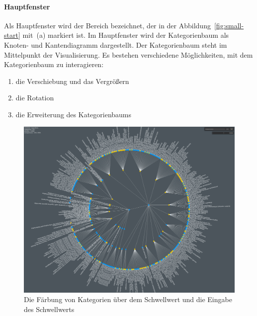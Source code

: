 \paragraph{Hauptfenster}
Als Hauptfenster wird der Bereich bezeichnet, der in der Abbildung~\ref{fig:small-start} mit~(a) markiert ist.
Im Hauptfenster wird der Kategorienbaum als Knoten- und Kantendiagramm dargestellt.
Der Kategorienbaum steht im Mittelpunkt der Visualisierung.
Es bestehen verschiedene Möglichkeiten, mit dem Kategorienbaum zu interagieren:
\begin{enumerate}[label*=(\arabic*),leftmargin=1.5cm,series=example]
\item{die Verschiebung und das Vergrößern}
\item{die Rotation}
\item{die Erweiterung des Kategorienbaums}
\end{enumerate}
\begin{figure}[H]
    \centering
    \includegraphics[width=\textwidth]{images/filter-7033}
    \caption{Die Färbung von Kategorien über dem Schwellwert und die Eingabe des Schwellwerts}
    \label{fig:simM-threshold-cat}
\end{figure}


